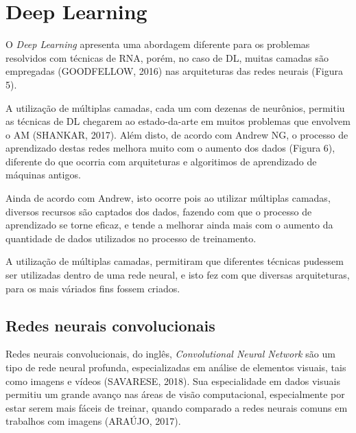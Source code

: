 \section{Deep Learning}

O \textit{Deep Learning} apresenta uma abordagem diferente para os problemas resolvidos com técnicas de RNA, porém, no caso de DL, muitas camadas são empregadas (GOODFELLOW, 2016) nas arquiteturas das redes neurais (Figura 5).


A utilização de múltiplas camadas, cada um com dezenas de neurônios, permitiu as técnicas de DL chegarem ao estado-da-arte em muitos problemas que envolvem o AM (SHANKAR, 2017).  Além disto, de acordo com Andrew NG, o processo de aprendizado destas redes melhora muito com o aumento dos dados (Figura 6), diferente do que ocorria com arquiteturas e algoritimos de aprendizado de máquinas antigos.


Ainda de acordo com Andrew, isto ocorre pois ao utilizar múltiplas camadas, diversos recursos são captados dos dados, fazendo com que o processo de aprendizado se torne eficaz, e tende a melhorar ainda mais com o aumento da quantidade de dados utilizados no processo de treinamento. 

A utilização de múltiplas camadas, permitiram que diferentes técnicas pudessem ser utilizadas dentro de uma rede neural, e isto fez com que diversas arquiteturas, para os mais váriados fins fossem criados.

\subsection{Redes neurais convolucionais}

Redes neurais convolucionais, do inglês, \textit{Convolutional Neural Network} são um tipo de rede neural profunda, especializadas em análise de elementos visuais, tais como imagens e vídeos (SAVARESE, 2018).  Sua especialidade em dados visuais permitiu um grande avanço nas áreas de visão computacional, especialmente por estar serem mais fáceis de treinar, quando comparado a redes neurais comuns em trabalhos com imagens (ARAÚJO, 2017).

